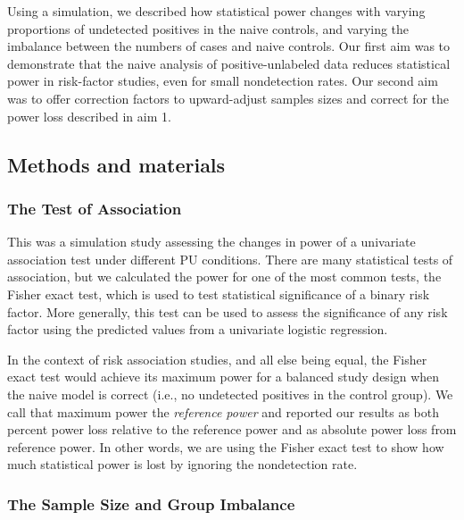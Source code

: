 \documentclass[
]{article}
\begin{document}
Using a simulation, we described how statistical power changes with
varying proportions of undetected positives in the naive controls, and
varying the imbalance between the numbers of cases and naive controls.
Our first aim was to demonstrate that the naive analysis of
positive-unlabeled data reduces statistical power in risk-factor
studies, even for small nondetection rates. Our second aim was to offer
correction factors to upward-adjust samples sizes and correct for the
power loss described in aim 1.

\newpage

\hypertarget{methods-and-materials}{%
\subsection{Methods and materials}\label{methods-and-materials}}

\hypertarget{the-test-of-association}{%
\subsubsection{The Test of Association}\label{the-test-of-association}}

This was a simulation study assessing the changes in power of a
univariate association test under different PU conditions. There are
many statistical tests of association, but we calculated the power for
one of the most common tests, the Fisher exact test, which is used to
test statistical significance of a binary risk factor. More generally,
this test can be used to assess the significance of any risk factor
using the predicted values from a univariate logistic regression.

In the context of risk association studies, and all else being equal,
the Fisher exact test would achieve its maximum power for a balanced
study design when the naive model is correct (i.e., no undetected
positives in the control group). We call that maximum power the
\emph{reference power} and reported our results as both percent power
loss relative to the reference power and as absolute power loss from
reference power. In other words, we are using the Fisher exact test to
show how much statistical power is lost by ignoring the nondetection
rate.

\hypertarget{the-sample-size-and-group-imbalance}{%
\subsubsection{The Sample Size and Group
Imbalance}\label{the-sample-size-and-group-imbalance}}
\end{document}
